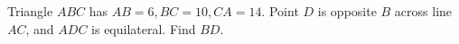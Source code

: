 Triangle $ABC$ has $AB=6,BC=10,CA=14$. Point $D$ is opposite $B$ across line $AC$, and $ADC$ is equilateral. Find $BD$.
